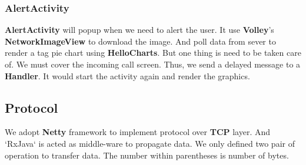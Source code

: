 \documentclass{article}
\begin{document}
    \subsubsection{AlertActivity}
    \textbf{AlertActivity} will popup when we need to alert the user.
    It use \textbf{Volley}'s \textbf{NetworkImageView} \cite{volley}to download the image.
    And poll data from sever to render a tag pie chart using \textbf{HelloCharts}.
    But one thing is need to be taken care of.
    We must cover the incoming call screen.
    Thus, we send a delayed message to a \textbf{Handler}.
    It would start the activity again and render the graphics.
    \subsection{Protocol}
    We adopt \textbf{Netty} \cite{netty} framework to implement protocol over \textbf{TCP} layer.
    And `RxJava` is acted as middle-ware to propagate data.
    We only defined two pair of operation to transfer data.
    The number within parentheses is number of bytes.
\end{document}
